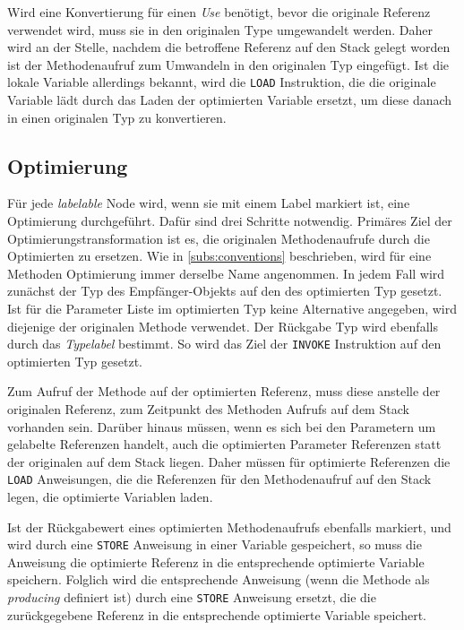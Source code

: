 Wird eine Konvertierung für einen \textit{Use} benötigt, bevor die originale Referenz verwendet wird, muss
sie in den originalen Type umgewandelt werden. Daher wird an der Stelle, nachdem 
die betroffene Referenz auf den Stack gelegt worden ist der Methodenaufruf zum 
Umwandeln in den originalen Typ eingefügt. Ist die lokale Variable 
allerdings bekannt, wird die \texttt{LOAD} Instruktion, die die originale Variable 
lädt durch das Laden der optimierten Variable ersetzt, um diese danach in einen originalen Typ zu konvertieren. 

\subsection{Optimierung}

Für jede \textit{labelable} Node wird, wenn sie mit einem Label markiert ist, eine Optimierung durchgeführt. 
Dafür sind drei Schritte notwendig. Primäres Ziel der Optimierungstransformation ist 
es, die originalen Methodenaufrufe durch die Optimierten zu 
ersetzen. Wie in \ref{subs:conventions} beschrieben, wird für eine Methoden Optimierung immer derselbe Name 
angenommen. In jedem Fall wird zunächst der Typ des Empfänger-Objekts auf den des optimierten Typ gesetzt. 
Ist für die Parameter Liste im optimierten Typ keine Alternative angegeben, wird diejenige der originalen 
Methode verwendet. Der Rückgabe Typ wird ebenfalls durch das \textit{Typelabel} bestimmt. So wird das Ziel der 
\texttt{INVOKE} Instruktion auf den optimierten Typ gesetzt.

Zum Aufruf der Methode auf der optimierten Referenz, muss diese anstelle der originalen Referenz, zum
Zeitpunkt des Methoden Aufrufs auf dem Stack vorhanden sein. Darüber hinaus müssen, wenn es sich bei den 
Parametern um gelabelte Referenzen handelt, auch die optimierten Parameter Referenzen statt der originalen 
auf dem Stack liegen. Daher müssen für optimierte Referenzen die \texttt{LOAD} Anweisungen, die die Referenzen
für den Methodenaufruf auf den Stack legen, die optimierte Variablen laden.

Ist der Rückgabewert eines optimierten Methodenaufrufs ebenfalls markiert, und wird durch eine 
\texttt{STORE} Anweisung in einer Variable gespeichert, so muss die Anweisung die optimierte Referenz 
in die entsprechende optimierte Variable speichern. Folglich wird die entsprechende Anweisung 
(wenn die Methode als \textit{producing} definiert ist) durch eine \texttt{STORE} Anweisung ersetzt, die 
die zurückgegebene Referenz in die entsprechende optimierte Variable speichert.

